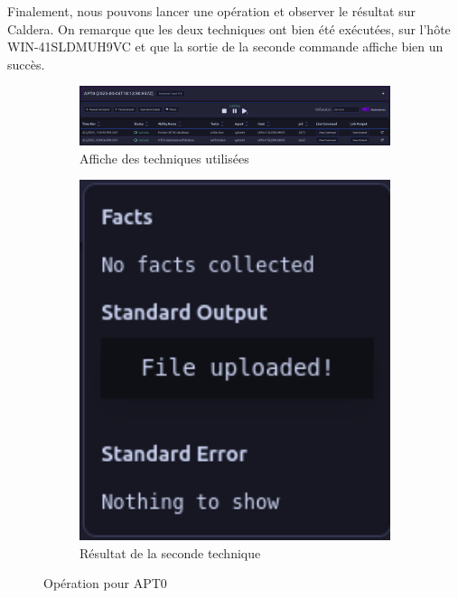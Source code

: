 \documentclass[12pt,letterpaper]{article}
\begin{document}
Finalement, nous pouvons lancer une opération et observer le résultat sur Caldera.
On remarque que les deux techniques ont bien été exécutées, sur l'hôte WIN-41SLDMUH9VC et que la sortie de la seconde commande affiche bien un succès.
\begin{figure}[h!]
    \centering
    \begin{subfigure}{1\textwidth}
        \centering
        \includegraphics[width=1\textwidth]{images/caldera/apt0_operation.png}
        \caption{Affiche des techniques utilisées}
        \label{fig:apt0_operation_1}
    \end{subfigure}
    \begin{subfigure}{0.3\textwidth}
        \centering
        \includegraphics[width=1\textwidth]{images/caldera/apt0_operation_result.png}
        \caption{Résultat de la seconde technique}
        \label{fig:apt0_operation_2}
    \end{subfigure}
    \caption{Opération pour APT0}
\end{figure}
\end{document}

